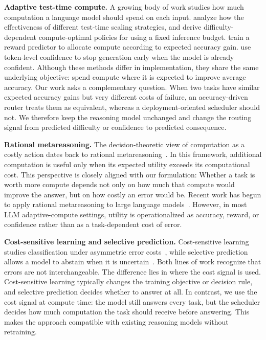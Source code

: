 \documentclass{article}
\begin{document}
\textbf{Adaptive test-time compute.}
A growing body of work studies how much computation a language model
should spend on each input. \citet{snell2024scaling} analyze how the effectiveness of different test-time scaling strategies, and derive difficulty-dependent compute-optimal policies for using a fixed inference budget. \citet{damani2024learning}
train a reward predictor to allocate compute according to expected
accuracy gain. \citet{manvi2024adaptive} use token-level confidence
to stop generation early when the model is already confident. Although
these methods differ in implementation, they share the same underlying
objective: spend compute where it is expected to improve average
accuracy. Our work asks a complementary question. When two tasks have
similar expected accuracy gains but very different costs of failure,
an accuracy-driven router treats them as equivalent, whereas a
deployment-oriented scheduler should not. We therefore keep the
reasoning model unchanged and change the routing signal from predicted
difficulty or confidence to predicted consequence.

\textbf{Rational metareasoning.}
The decision-theoretic view of computation as a costly action dates
back to rational metareasoning~\citep{russell1991right,
hay2012selecting}. In this framework, additional computation is useful
only when its expected utility exceeds its computational cost.
This perspective is closely aligned with our formulation: Whether a task is worth more compute depends not only on how much that compute would improve the answer, but on how costly an error would be. Recent work
has begun to apply rational metareasoning to large language
models~\citep{yang2024rational}. However, in most LLM adaptive-compute
settings, utility is operationalized as accuracy, reward, or confidence
rather than as a task-dependent cost of error.

\textbf{Cost-sensitive learning and selective prediction.}
Cost-sensitive learning studies classification under asymmetric error
costs~\citep{elkan2001foundations}, while selective prediction allows
a model to abstain when it is uncertain~\citep{geifman2017selective}.
Both lines of work recognize that errors are not interchangeable. The
difference lies in where the cost signal is used. Cost-sensitive learning
typically changes the training objective or decision rule, and selective prediction decides whether to answer at all. In contrast, we use the cost signal at compute time: the model still answers every
task, but the scheduler decides how much computation the task should receive before answering. This makes the approach compatible with existing reasoning models without retraining.
\end{document}
